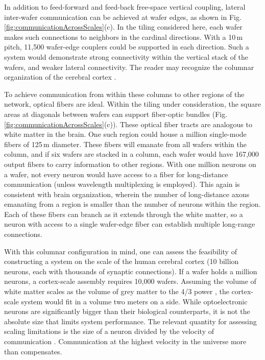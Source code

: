 \documentclass[twocolumn]{article}
\begin{document}
In addition to feed-forward and feed-back free-space vertical coupling, lateral inter-wafer communication can be achieved at wafer edges, as shown in Fig.\,\ref{fig:communicationAcrossScales}(c). In the tiling considered here, each wafer makes such connections to neighbors in the cardinal directions. With a 10\,\textmu m pitch, 11,500 wafer-edge couplers could be supported in each direction. Such a system would demonstrate strong connectivity within the vertical stack of the wafers, and weaker lateral connectivity. The reader may recognize the columnar organization of the cerebral cortex \cite{mo1997}.

To achieve communication from within these columns to other regions of the network, optical fibers are ideal. Within the tiling under consideration, the square areas at diagonals between wafers can support fiber-optic bundles (Fig.\,\ref{fig:communicationAcrossScales}(c)). These optical fiber tracts are analogous to white matter in the brain. One such region could house a million single-mode fibers of 125\,\textmu m diameter. These fibers will emanate from all wafers within the column, and if six wafers are stacked in a column, each wafer would have 167,000 output fibers to carry information to other regions. With one million neurons on a wafer, not every neuron would have access to a fiber for long-distance communication (unless wavelength multiplexing is employed). This again is consistent with brain organization, wherein the number of long-distance axons emanating from a region is smaller than the number of neurons within the region. Each of these fibers can branch as it extends through the white matter, so a neuron with access to a single wafer-edge fiber can establish multiple long-range connections. 

With this columnar configuration in mind, one can assess the feasibility of constructing a system on the scale of the human cerebral cortex (10 billion neurons, each with thousands of synaptic connections). If a wafer holds a million neurons, a cortex-scale assembly requires 10,000 wafers. Assuming the volume of white matter scales as the volume of grey matter to the 4/3 power \cite{zhse2000}, the cortex-scale system would fit in a volume two meters on a side. While optoelectronic neurons are significantly bigger than their biological counterparts, it is not the absolute size that limits system performance. The relevant quantity for assessing scaling limitations is the size of a neuron divided by the velocity of communication \cite{sh2018_ICRC}. Communication at the highest velocity in the universe more than compensates. 
\end{document}
